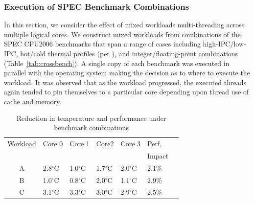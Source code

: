 \documentclass[times, 10pt,twocolumn]{IEEEtran}
\begin{document}
\subsubsection{Execution of SPEC Benchmark Combinations}
\label{sec:cross-funct-unit} 
In this section, we consider the effect of
mixed workloads multi-threading across multiple logical cores.  We
construct mixed workloads from combinations of the SPEC CPU2006
benchmarks that span a range of cases including high-IPC/low-IPC,
hot/cold thermal profiles (per \cite{Kursun2008}), and
integer/floating-point combinations (Table~\ref{tab:crossbench}). A
single copy of each benchmark was executed in parallel with the
operating system making the decision as to where to execute the
workload.  It was observed that as the workload progressed, the executed
threads again tended to pin themselves to a particular core depending
upon thread use of cache and memory.

\newline
\begin{table}[!bp] 
\centering
  \caption{Reduction in temperature and performance under benchmark combinations}
  \label{tab:mixwkload}
  \begin{tabular}{cllllll} 
\hline
Workload & Core 0 & Core 1 & Core2 & Core 3 & Perf. \\
 &  &  &  &  & Impact \\
\hline
\hline
A & 2.8$^{\circ}$C & 1.0$^{\circ}$C & 1.7$^{\circ}$C & 2.0$^{\circ}$C & 2.1\% \\
B & 1.0$^{\circ}$C & 0.8$^{\circ}$C & 2.0$^{\circ}$C & 1.1$^{\circ}$C & 2.9\% \\
C & 3.1$^{\circ}$C & 3.3$^{\circ}$C & 3.0$^{\circ}$C & 2.9$^{\circ}$C & 2.5\% \\
\hline
  \end{tabular}

\end{table}
 
\end{document}
